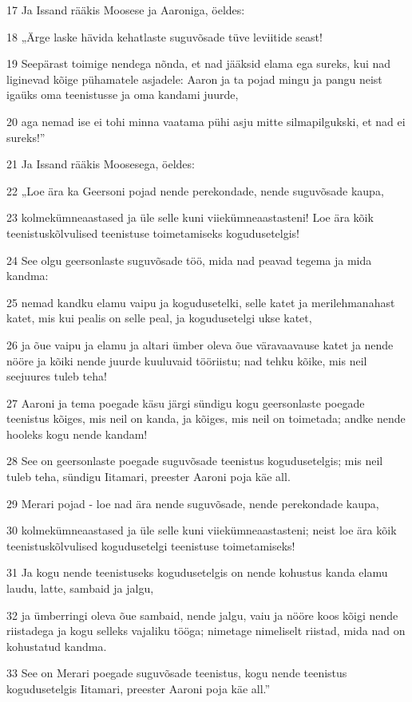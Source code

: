 \par 17 Ja Issand rääkis Moosese ja Aaroniga, öeldes:
\par 18 „Ärge laske hävida kehatlaste suguvõsade tüve leviitide seast!
\par 19 Seepärast toimige nendega nõnda, et nad jääksid elama ega sureks, kui nad liginevad kõige pühamatele asjadele: Aaron ja ta pojad mingu ja pangu neist igaüks oma teenistusse ja oma kandami juurde,
\par 20 aga nemad ise ei tohi minna vaatama pühi asju mitte silmapilgukski, et nad ei sureks!”
\par 21 Ja Issand rääkis Moosesega, öeldes:
\par 22 „Loe ära ka Geersoni pojad nende perekondade, nende suguvõsade kaupa,
\par 23 kolmekümneaastased ja üle selle kuni viiekümneaastasteni! Loe ära kõik teenistuskõlvulised teenistuse toimetamiseks kogudusetelgis!
\par 24 See olgu geersonlaste suguvõsade töö, mida nad peavad tegema ja mida kandma:
\par 25 nemad kandku elamu vaipu ja kogudusetelki, selle katet ja merilehmanahast katet, mis kui pealis on selle peal, ja kogudusetelgi ukse katet,
\par 26 ja õue vaipu ja elamu ja altari ümber oleva õue väravaavause katet ja nende nööre ja kõiki nende juurde kuuluvaid tööriistu; nad tehku kõike, mis neil seejuures tuleb teha!
\par 27 Aaroni ja tema poegade käsu järgi sündigu kogu geersonlaste poegade teenistus kõiges, mis neil on kanda, ja kõiges, mis neil on toimetada; andke nende hooleks kogu nende kandam!
\par 28 See on geersonlaste poegade suguvõsade teenistus kogudusetelgis; mis neil tuleb teha, sündigu Iitamari, preester Aaroni poja käe all.
\par 29 Merari pojad - loe nad ära nende suguvõsade, nende perekondade kaupa,
\par 30 kolmekümneaastased ja üle selle kuni viiekümneaastasteni; neist loe ära kõik teenistuskõlvulised kogudusetelgi teenistuse toimetamiseks!
\par 31 Ja kogu nende teenistuseks kogudusetelgis on nende kohustus kanda elamu laudu, latte, sambaid ja jalgu,
\par 32 ja ümberringi oleva õue sambaid, nende jalgu, vaiu ja nööre koos kõigi nende riistadega ja kogu selleks vajaliku tööga; nimetage nimeliselt riistad, mida nad on kohustatud kandma.
\par 33 See on Merari poegade suguvõsade teenistus, kogu nende teenistus kogudusetelgis Iitamari, preester Aaroni poja käe all.”
